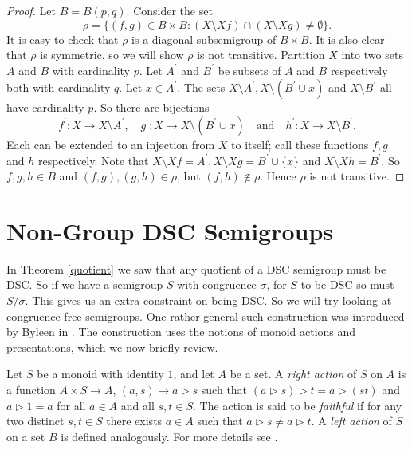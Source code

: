 \documentclass[a4paper, 12pt,reqno]{amsart}
\theoremstyle{plain}
\theoremstyle{definition}
\theoremstyle{remark}
\begin{document}
\begin{proof}
    Let $B = B(p,q)$.
    Consider the set 
    \[
    \rho = \bigl\{ (f,g) \in B \times B \colon (X \setminus X f) \cap (X \setminus X g) \neq \emptyset \bigr\}.
    \]
     It is easy to check that $\rho$ is a diagonal subsemigroup of $B \times B$. It is also clear that $\rho$ is symmetric, so we will show $\rho$ is not transitive.
    Partition $X$ into two sets $A$ and $B$ with cardinality $p$. Let $A^\prime$ and $ B^\prime$ be subsets of $A$ and $B$ respectively both with cardinality $q$.
    Let $x \in A^\prime$. The sets $X \setminus A^\prime , X \setminus (B^\prime \cup {x} )$ and $X \setminus B^\prime$ all have cardinality $p$. 
    So there are bijections 
    \[
    f^\prime\colon X \to X \setminus A^\prime ,\quad  g^\prime \colon X \to X \setminus (B^\prime \cup {x})\quad \text{and}\quad h^\prime \colon  X \to X \setminus B^\prime.
    \] 
    Each can be extended to an injection from $X$ to itself; call these functions $f,g$ and $h$ respectively.
    Note that $X\setminus Xf = A^\prime, X\setminus Xg = B^\prime \cup \{ x \}$ and $X\setminus Xh = B^\prime$. So $f,g,h \in B$ and $(f,g),(g,h) \in \rho$, but $(f,h) \notin \rho$. Hence $\rho$ is not transitive.
\end{proof}

\section{ Non-Group DSC Semigroups}

In Theorem \ref{quotient} we saw that any quotient of a DSC semigroup must be DSC.
So if we have a semigroup $S$ with congruence $\sigma$, for $S$ to be DSC so must $S/\sigma$. 
This gives us an extra constraint on being DSC.
So we will try looking at congruence free semigroups.
One rather general such construction was introduced by Byleen in \cite{Byleen}.
The construction uses the notions of monoid actions and presentations, which we now briefly review.

Let $S$ be a monoid with identity $1$, and let $A$ be a set. A \emph{right action} of $S$ on $A$ is a function
$A\times S\rightarrow A$, $(a,s)\mapsto a\triangleright s$ such that
$(a\triangleright s)\triangleright t=a\triangleright (st)$ and $a\triangleright 1=a$ for all $a\in A$ and all $s,t\in S$.
The action is said to be \emph{faithful} if for any two distinct $s,t\in S$ there exists $a\in A$ such that
$a\triangleright s\neq a\triangleright t$.
A \emph{left action} of $S$ on a set $B$ is defined analogously.
For more details see  \cite[Section 8.1]{Ho95}.
\end{document}
